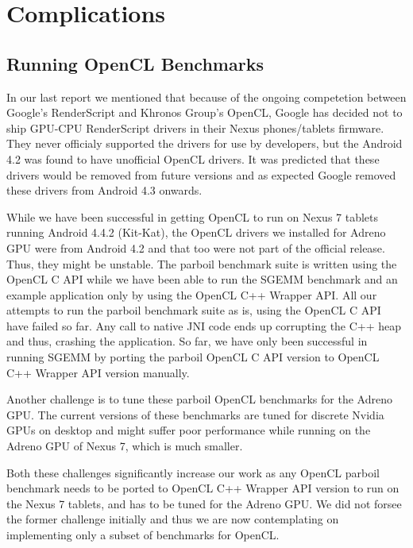 \section*{Complications}
\subsection*{Running OpenCL Benchmarks}
In our last report we mentioned that because of the ongoing competetion between
Google's RenderScript and Khronos Group's OpenCL, Google has decided not to ship
GPU-CPU RenderScript drivers in their Nexus phones/tablets firmware. They never
officialy supported the drivers for use by developers, but the Android 4.2 was
found to have unofficial OpenCL drivers. It was predicted that these drivers
would be removed from future versions and as expected Google removed these drivers from
Android 4.3 onwards. 

While we have been successful in getting OpenCL to run on Nexus 7 tablets
running Android 4.4.2 (Kit-Kat), the OpenCL drivers we installed for Adreno
GPU were from
Android 4.2 and that too were not part of the official release. Thus, they might
be unstable. The parboil benchmark suite is written using the OpenCL C API while
we have been able to run the SGEMM benchmark and an example application only by using
the OpenCL C++ Wrapper API. All our attempts to run the parboil benchmark suite as
is, using the OpenCL C API have failed so far. Any call to native JNI code
ends up corrupting the C++ heap and thus, crashing the application. So far, we
have only been successful in running SGEMM by porting the parboil OpenCL C
API version to OpenCL C++ Wrapper API version manually.

Another challenge is to tune these parboil OpenCL benchmarks for the Adreno GPU.
The current versions of these benchmarks are tuned for discrete Nvidia GPUs on desktop and might
suffer poor performance while running on the Adreno GPU of Nexus 7, which is much
smaller.

Both these challenges significantly
increase our work as any OpenCL parboil benchmark needs to be ported to OpenCL
C++ Wrapper API version to run on the Nexus 7 tablets, and has to be tuned for
the Adreno GPU. We did not forsee the former
challenge initially and thus we are now contemplating on implementing only a
subset of benchmarks for OpenCL.
